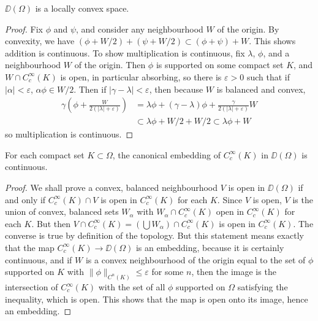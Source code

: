 \begin{theorem}
    $\DD(\Omega)$ is a locally convex space.
\end{theorem}
\begin{proof}
    Fix $\phi$ and $\psi$, and consider any neighbourhood $W$ of the origin. By convexity, we have $(\phi + W/2) + (\psi + W/2) \subset (\phi + \psi) + W$. This shows addition is continuous. To show multiplication is continuous, fix $\lambda$, $\phi$, and a neighbourhood $W$ of the origin. Then $\phi$ is supported on some compact set $K$, and $W \cap C_c^\infty(K)$ is open, in particular absorbing, so there is $\varepsilon > 0$ such that if $|\alpha| < \varepsilon$, $\alpha \phi \in W/2$. Then if $|\gamma - \lambda| < \varepsilon$, then because $W$ is balanced and convex,
    \begin{align*}
        \gamma \left(\phi + \frac{W}{2(|\lambda| + \varepsilon)} \right) &= \lambda \phi + (\gamma - \lambda) \phi + \frac{\gamma}{2(|\lambda| + \varepsilon)} W\\
        &\subset \lambda \phi + W/2 + W/2 \subset \lambda \phi + W
    \end{align*}
    so multiplication is continuous.
\end{proof}

\begin{theorem}
    For each compact set $K \subset \Omega$, the canonical embedding of $C_c^\infty(K)$ in $\DD(\Omega)$ is continuous.
\end{theorem}
\begin{proof}
    We shall prove a convex, balanced neighbourhood $V$ is open in $\DD(\Omega)$ if and only if $C_c^\infty(K) \cap V$ is open in $C_c^\infty(K)$ for each $K$. Since $V$ is open, $V$ is the union of convex, balanced sets $W_\alpha$ with $W_\alpha \cap C_c^\infty(K)$ open in $C_c^\infty(K)$ for each $K$. But then $V \cap C_c^\infty(K) = (\bigcup W_\alpha) \cap C_c^\infty(K)$ is open in $C_c^\infty(K)$. The converse is true by definition of the topology. But this statement means exactly that the map $C_c^\infty(K) \to \DD(\Omega)$ is an embedding, because it is certainly continuous, and if $W$ is a convex neighbourhood of the origin equal to the set of $\phi$ supported on $K$ with $\| \phi \|_{C^n(K)} \leq \varepsilon$ for some $n$, then the image is the intersection of $C_c^\infty(K)$ with the set of all $\phi$ supported on $\Omega$ satisfying the inequality, which is open. This shows that the map is open onto its image, hence an embedding.
\end{proof}

